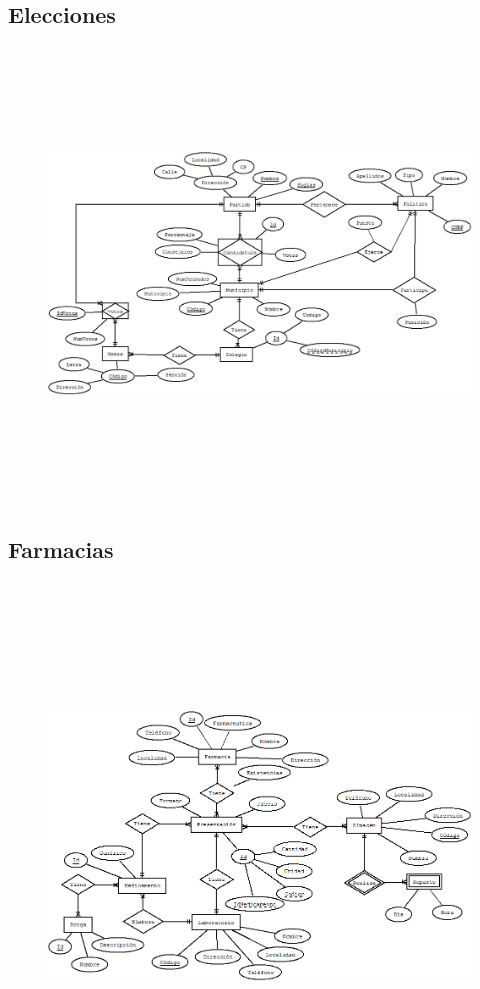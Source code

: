 \documentclass[12pt, titlepage]{article}
\begin{document}
	\subsection{Elecciones}
	\begin{figure}[H]
		\begin{center}
			\includegraphics[width=16cm, height=12cm]{img/Elecciones.png}
			\label{fig:hasta-use6}
		\end{center}
	\end{figure}
	\subsection{Farmacias}
	\begin{figure}[H]
		\begin{center}
			\includegraphics[width=16cm, height=14cm]{img/Farmacia.png}
			\label{fig:hasta-us3}
		\end{center}
	\end{figure}
\end{document}
